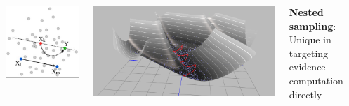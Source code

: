 \documentclass[aspectratio=169]{beamer}
\begin{document}
\begin{frame}
\begin{columns}
\begin{columns}
        \includegraphics[width=\textwidth]{figures/zeus}
        \end{columns}
        \includegraphics[width=\textwidth]{figures/hmc_explained}
        \vspace{-20pt}
        \begin{center}
            \textbf{Nested sampling}: \\
            Unique in targeting 
            evidence computation directly
        \end{center}
    \end{columns}
\end{frame}
\end{document}
